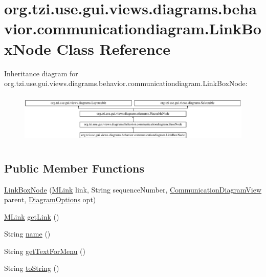 \hypertarget{classorg_1_1tzi_1_1use_1_1gui_1_1views_1_1diagrams_1_1behavior_1_1communicationdiagram_1_1_link_box_node}{\section{org.\-tzi.\-use.\-gui.\-views.\-diagrams.\-behavior.\-communicationdiagram.\-Link\-Box\-Node Class Reference}
\label{classorg_1_1tzi_1_1use_1_1gui_1_1views_1_1diagrams_1_1behavior_1_1communicationdiagram_1_1_link_box_node}
}
Inheritance diagram for org.\-tzi.\-use.\-gui.\-views.\-diagrams.\-behavior.\-communicationdiagram.\-Link\-Box\-Node\-:\begin{figure}[H]
\begin{center}
\leavevmode
\includegraphics[height=2.461539cm]{classorg_1_1tzi_1_1use_1_1gui_1_1views_1_1diagrams_1_1behavior_1_1communicationdiagram_1_1_link_box_node}
\end{center}
\end{figure}
\subsection*{Public Member Functions}
\begin{DoxyCompactItemize}
\item 
\hyperlink{classorg_1_1tzi_1_1use_1_1gui_1_1views_1_1diagrams_1_1behavior_1_1communicationdiagram_1_1_link_box_node_aaedd5a274cf589e87d1f1b63f2843415}{Link\-Box\-Node} (\hyperlink{interfaceorg_1_1tzi_1_1use_1_1uml_1_1sys_1_1_m_link}{M\-Link} link, String sequence\-Number, \hyperlink{classorg_1_1tzi_1_1use_1_1gui_1_1views_1_1diagrams_1_1behavior_1_1communicationdiagram_1_1_communication_diagram_view}{Communication\-Diagram\-View} parent, \hyperlink{classorg_1_1tzi_1_1use_1_1gui_1_1views_1_1diagrams_1_1_diagram_options}{Diagram\-Options} opt)
\item 
\hyperlink{interfaceorg_1_1tzi_1_1use_1_1uml_1_1sys_1_1_m_link}{M\-Link} \hyperlink{classorg_1_1tzi_1_1use_1_1gui_1_1views_1_1diagrams_1_1behavior_1_1communicationdiagram_1_1_link_box_node_a40751133aa65a9ea1cec6c00f460e9a6}{get\-Link} ()
\item 
String \hyperlink{classorg_1_1tzi_1_1use_1_1gui_1_1views_1_1diagrams_1_1behavior_1_1communicationdiagram_1_1_link_box_node_ad8227e057a3e9801fbed661cfa4f3d5c}{name} ()
\item 
String \hyperlink{classorg_1_1tzi_1_1use_1_1gui_1_1views_1_1diagrams_1_1behavior_1_1communicationdiagram_1_1_link_box_node_a31a46f0f7766fdbf8d6b83e72093a6c2}{get\-Text\-For\-Menu} ()
\item 
String \hyperlink{classorg_1_1tzi_1_1use_1_1gui_1_1views_1_1diagrams_1_1behavior_1_1communicationdiagram_1_1_link_box_node_a7823f3a8bca6648444b658ba9b5abc0b}{to\-String} ()
\end{DoxyCompactItemize}
